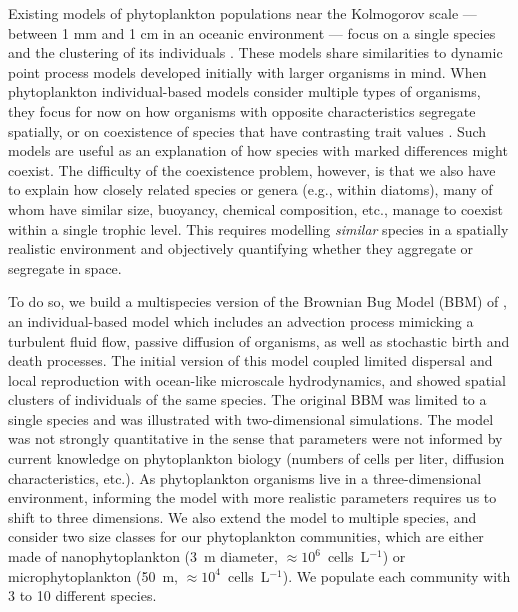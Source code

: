 \documentclass[12pt,english]{article}
\begin{document}
Existing models of phytoplankton populations near the Kolmogorov scale
--- between 1 mm and 1 cm in an oceanic environment \citep{barton_impact_2014}
--- focus on a single species and the clustering of its individuals
\citep{young_reproductive_2001,birch_master_2006,bouderbala_3d_2018,breier_emergence_2018}. These models share similarities to dynamic point process models \citep{law_population_2003,bolker_spatial_1999,plank_spatial_2015}
developed initially with larger organisms in mind. When phytoplankton
individual-based models consider multiple types of organisms, they
focus for now on how organisms with opposite characteristics \citep[e.g., increase versus decrease in density with turbulence in][]{borgnino_turbulence_2019,arrieta_fate_2020}
segregate spatially, or on coexistence of species that have contrasting
trait values \citep[e.g., size in][]{benczik_coexistence_2006}. Such models are useful as an explanation of how species with marked differences might coexist. The difficulty of the coexistence problem, however, is that we also have to explain how closely related species or genera (e.g., within diatoms), many of whom have similar size, buoyancy, chemical composition, etc., manage to coexist within a single trophic level.
This requires modelling \emph{similar} species in a spatially realistic
environment and objectively quantifying whether they aggregate or
segregate in space.

To do so, we build a multispecies version of the Brownian Bug Model
(BBM) of \citet{young_reproductive_2001}, an individual-based model
which includes an advection process mimicking a turbulent fluid flow,
passive diffusion of organisms, as well as stochastic birth and death
processes. The initial version of this model \citep{young_reproductive_2001}
coupled limited dispersal and local reproduction with ocean-like microscale
hydrodynamics, and showed spatial clusters of individuals of the same
species. The original BBM was limited to a single species and was
illustrated with two-dimensional simulations. The model was not strongly
quantitative \citep{picoche_rescience_2022} in the sense that parameters
were not informed by current knowledge on phytoplankton biology (numbers
of cells per liter, diffusion characteristics, etc.). As phytoplankton
organisms live in a three-dimensional environment, informing the model
with more realistic parameters requires us to shift to three dimensions.
We also extend the model to multiple species, and consider two size
classes for our phytoplankton communities, which are either made of
nanophytoplankton (3~\textmu m diameter, $\approx10^{6}$~cells~L$^{-1}$)
or microphytoplankton (50~\textmu m, $\approx10^{4}$~cells~L$^{-1}$).
We populate each community with 3 to 10 different species.
\end{document}
